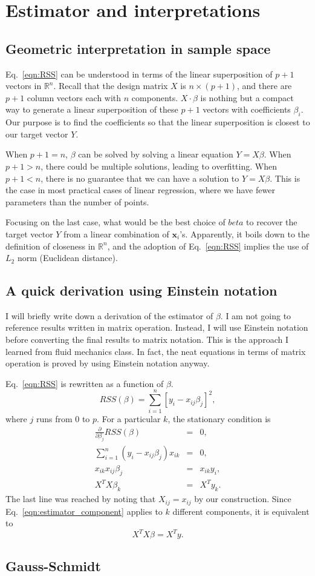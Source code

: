 \section{Estimator and interpretations}
\subsection{Geometric interpretation in sample space}
Eq.~\ref{eqn:RSS} can be understood in terms of the linear superposition of $p+1$ vectors in $\mathbb{R}^{n}$. Recall that the design matrix $X$ is $n\times(p+1)$, and there are $p+1$ column vectors each with $n$ components. $X\cdot\beta$ is nothing but a compact way to generate a linear superposition of these $p+1$ vectors with coefficients $\beta_i$. Our purpose is to find the coefficients so that the linear superposition is closest to our target vector $Y$.

When $p+1 = n$, $\beta$ can be solved by solving a linear equation $Y=X\beta$. When $p+1 > n$, there could be multiple solutions, leading to overfitting. When $p+1 < n$, there is no guarantee that we can have a solution to $Y=X\beta$. This is the case in most practical cases of linear regression, where we have fewer parameters than the number of points.

Focusing on the last case, what would be the best choice of $beta$ to recover the target vector $Y$ from a linear combination of $\mathbf{x}_i$'s. Apparently, it boils down to the definition of closeness in $\mathbb{R}^n$, and the adoption of Eq.~\ref{eqn:RSS} implies the use of $L_2$ norm (Euclidean distance).
\subsection{A quick derivation using Einstein notation}
I will briefly write down a derivation of the estimator of $\beta$. I am not going to reference results written in matrix operation. Instead, I will use Einstein notation before converting the final results to matrix notation. This is the approach I learned from fluid mechanics class. In fact, the neat equations in terms of matrix operation is proved by using Einstein notation anyway.

Eq.~\ref{eqn:RSS} is rewritten as a function of $\beta$.
\begin{equation}
RSS(\beta) = \sum_{i=1}^{n}\left[ y_i - x_{ij}\beta_j\right]^2,
\end{equation}
where $j$ runs from $0$ to $p$. For a particular $k$, the stationary condition is
\begin{eqnarray}
\frac{\partial}{\partial\beta_j}RSS(\beta) &=& 0, \\
\sum_{i=1}^{n}\left(y_i-x_{ij}\beta_j\right)x_{ik} & = & 0,\\
x_{ik}x_{ij}\beta_j &=& x_{ik}y_i, \\
{X^TX\beta}_k &=& {X^Ty}_k.\label{eqn:estimator_component}
\end{eqnarray} 
The last line was reached by noting that $X_{ij}=x_{ij}$ by our construction. Since Eq.~\ref{eqn:estimator_component} applies to $k$ different components, it is equivalent to
\begin{equation}
X^TX\beta = X^Ty.
\end{equation}
\subsection{Gauss-Schmidt}


